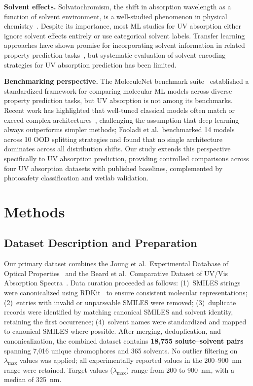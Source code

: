 \documentclass[11pt,a4paper]{article}
\begin{document}
\textbf{Solvent effects.}
Solvatochromism, the shift in absorption wavelength as a function of solvent environment, is a well-studied phenomenon in physical chemistry~\cite{reichardt2011solvents}.
Despite its importance, most ML studies for UV absorption either ignore solvent effects entirely or use categorical solvent labels.
Transfer learning approaches have shown promise for incorporating solvent information in related property prediction tasks~\cite{vermeire2021transfer}, but systematic evaluation of solvent encoding strategies for UV absorption prediction has been limited.

\textbf{Benchmarking perspective.}
The MoleculeNet benchmark suite~\cite{wuMoleculeNet2018} established a standardized framework for comparing molecular ML models across diverse property prediction tasks, but UV absorption is not among its benchmarks.
Recent work has highlighted that well-tuned classical models often match or exceed complex architectures~\cite{panapitiya2022evaluation, walters2021applications, fooladi2025evaluating}, challenging the assumption that deep learning always outperforms simpler methods; Fooladi et al.\ benchmarked 14 models across 10 OOD splitting strategies and found that no single architecture dominates across all distribution shifts.
Our study extends this perspective specifically to UV absorption prediction, providing controlled comparisons across four UV absorption datasets with published baselines, complemented by photosafety classification and wetlab validation.


\section{Methods}
\label{sec:methods}

\subsection{Dataset Description and Preparation}
\label{sec:dataset}

Our primary dataset combines the Joung et al.\ Experimental Database of Optical Properties~\cite{joung2020experimental} and the Beard et al.\ Comparative Dataset of UV/Vis Absorption Spectra~\cite{beard2019comparative}.
Data curation proceeded as follows: (1)~SMILES strings were canonicalized using RDKit~\cite{landrumRdkitRdkit2020_03_12020} to ensure consistent molecular representations; (2)~entries with invalid or unparseable SMILES were removed; (3)~duplicate records were identified by matching canonical SMILES and solvent identity, retaining the first occurrence; (4)~solvent names were standardized and mapped to canonical SMILES where possible.
After merging, deduplication, and canonicalization, the combined dataset contains \textbf{18,755 solute--solvent pairs} spanning 7,016 unique chromophores and 365 solvents.
No outlier filtering on $\lambda_{\max}$ values was applied; all experimentally reported values in the 200--900~nm range were retained.
Target values ($\lambda_{\max}$) range from 200 to 900~nm, with a median of 325~nm.
\end{document}
